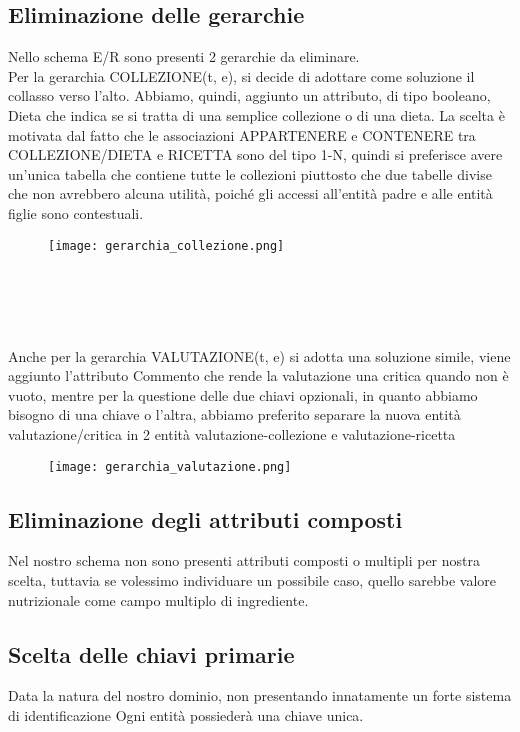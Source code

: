 ﻿\documentclass[a4paper,12pt]{report}
\begin{document}
\subsection{Eliminazione delle gerarchie}
Nello schema E/R sono presenti 2 gerarchie da eliminare.\\
Per la gerarchia COLLEZIONE(t, e), si decide di adottare come soluzione il collasso verso l'alto.
Abbiamo, quindi, aggiunto un attributo, di tipo booleano, Dieta che indica se si tratta di una semplice collezione o di una dieta.
La scelta è motivata dal fatto che le associazioni APPARTENERE e CONTENERE tra COLLEZIONE/DIETA e RICETTA sono del tipo 1-N, quindi si preferisce avere
un'unica tabella che contiene tutte le collezioni piuttosto che due tabelle divise che non avrebbero alcuna utilità, poiché gli accessi all'entità padre e alle entità figlie sono contestuali.\\
\begin{figure}[h!]
    \centering
    \texttt{[image: gerarchia\_collezione.png]}
\end{figure}
\\\\\\\\Anche per la gerarchia VALUTAZIONE(t, e) si adotta una soluzione simile, viene aggiunto l'attributo Commento 
che rende la valutazione una critica quando non è vuoto, mentre per la questione delle due chiavi opzionali, in quanto abbiamo bisogno di 
una chiave o l'altra, abbiamo preferito separare la nuova entità valutazione/critica in 2 entità valutazione-collezione e valutazione-ricetta \\
\begin{figure}[h!]
    \centering
    \texttt{[image: gerarchia\_valutazione.png]}
\end{figure}
\subsection{Eliminazione degli attributi composti}
Nel nostro schema non sono presenti attributi composti o multipli per nostra scelta,
tuttavia se volessimo individuare un possibile caso, quello sarebbe valore nutrizionale
come campo multiplo di ingrediente.
\subsection{Scelta delle chiavi primarie}
Data la natura del nostro dominio, non presentando innatamente un forte sistema di identificazione
Ogni entità possiederà una chiave unica.
\end{document}

